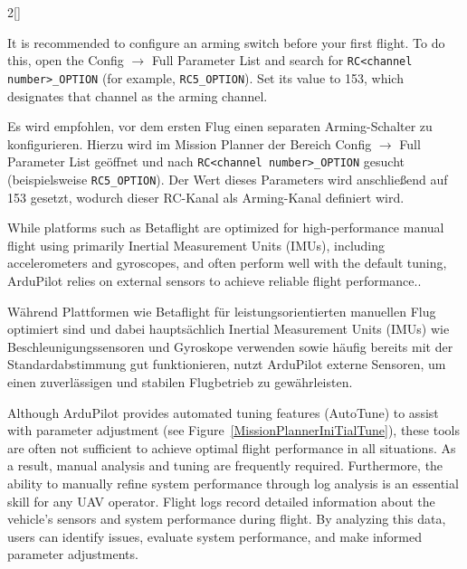 \begin{paracol}{2}[]
\coleng

It is recommended to configure an arming switch before your first flight. To do this, open the Config \(\longrightarrow\) Full Parameter List and search for \verb!RC<channel number>_OPTION! (for example, \verb!RC5_OPTION!). Set its value to 153, which designates that channel as the arming channel.

\colger

Es wird empfohlen, vor dem ersten Flug einen separaten Arming-Schalter zu konfigurieren. Hierzu wird im Mission Planner der Bereich Config \(\longrightarrow\) Full Parameter List geöffnet und nach \verb!RC<channel number>_OPTION! gesucht (beispielsweise \verb!RC5_OPTION!). Der Wert dieses Parameters wird anschließend auf 153 gesetzt, wodurch dieser RC-Kanal als Arming-Kanal definiert wird.

\colende

\renewcommand{\deutschertitel}{Log-Analyse}
\renewcommand{\englischertitel}{Log Analysis}
\makrounterabschnitt
\label{ArdupilotLogging}

While platforms such as Betaflight are optimized for high-performance manual flight using primarily Inertial Measurement Units (IMUs), including accelerometers and gyroscopes, and often perform well with the default tuning, ArduPilot relies on external sensors to achieve reliable flight performance..

\colger

Während Plattformen wie Betaflight für leistungsorientierten manuellen Flug optimiert sind und dabei hauptsächlich Inertial Measurement Units (IMUs) wie Beschleunigungssensoren und Gyroskope verwenden sowie häufig bereits mit der Standardabstimmung gut funktionieren, nutzt ArduPilot  externe Sensoren, um einen zuverlässigen und stabilen Flugbetrieb zu gewährleisten.

\coleng

Although ArduPilot provides automated tuning features (AutoTune) to assist with parameter adjustment (see Figure~\ref{MissionPlannerIniTialTune}), these tools are often not sufficient to achieve optimal flight performance in all situations. As a result, manual analysis and tuning are frequently required. Furthermore, the ability to manually refine system performance through log analysis is an essential skill for any UAV operator. Flight logs record detailed information about the vehicle’s sensors and system performance during flight. By analyzing this data, users can identify issues, evaluate system performance, and make informed parameter adjustments.


\end{paracol}
